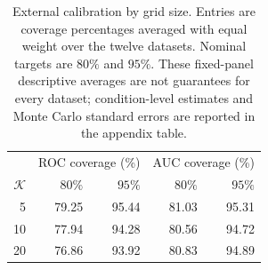 \begin{table}[t]
\centering
\caption{External calibration by grid size. Entries are coverage percentages averaged with equal weight over the twelve datasets. Nominal targets are $80\%$ and $95\%$. These fixed-panel descriptive averages are not guarantees for every dataset; condition-level estimates and Monte Carlo standard errors are reported in the appendix table.}
\label{tab:empirical-evaluation-on-real-world-datasets-external-calibration-by-grid}
\begingroup
\small
\setlength{\tabcolsep}{6pt}
\renewcommand{\arraystretch}{1.12}
\begin{tabular}{@{}rrrrr@{}}
\hline
 & \multicolumn{2}{c}{ROC coverage (\%)} & \multicolumn{2}{c}{AUC coverage (\%)} \\
$\mathcal K$ & $80\%$ & $95\%$ & $80\%$ & $95\%$ \\
\hline
5 & 79.25 & 95.44 & 81.03 & 95.31 \\
10 & 77.94 & 94.28 & 80.56 & 94.72 \\
20 & 76.86 & 93.92 & 80.83 & 94.89 \\
\hline
\end{tabular}
\endgroup
\end{table}
